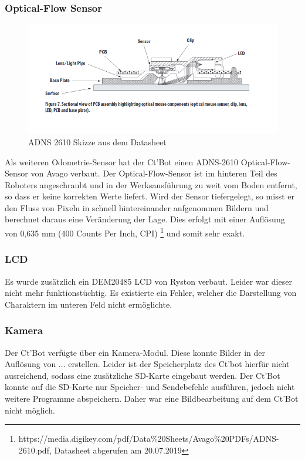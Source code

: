 \documentclass[twoside,11pt, a4paper]{report}
\begin{document}
	\subsubsection{Optical-Flow Sensor}
	\begin{figure}[!htb]
		\centering
		\includegraphics[scale=0.55]{images/adns.png}
		\caption{ADNS 2610 Skizze aus dem Datasheet}
	\end{figure}
	Als weiteren Odometrie-Sensor hat der Ct'Bot einen ADNS-2610 Optical-Flow-Sensor von Avago verbaut. Der Optical-Flow-Sensor ist im hinteren Teil des Roboters angeschraubt und in der Werksausführung zu weit vom Boden entfernt, so dass er keine korrekten Werte liefert. Wird der Sensor tiefergelegt, so misst er den Fluss von Pixeln in schnell hintereinander aufgenommen Bildern und berechnet daraus eine Veränderung der Lage. Dies erfolgt mit einer Auflösung von 0,635 mm (400 Counts Per Inch, CPI) \footnote{https://media.digikey.com/pdf/Data\%20Sheets/Avago\%20PDFs/ADNS-2610.pdf, Datasheet abgerufen am 20.07.2019} und somit sehr exakt. 
	
	\subsubsection{LCD}
	Es wurde zusätzlich ein DEM20485 LCD von Ryston verbaut. Leider war dieser nicht mehr funktionstüchtig. Es existierte ein Fehler, welcher die Darstellung von Charaktern im unteren Feld nicht ermöglichte. 
	
	\subsubsection{Kamera}
	Der Ct'Bot verfügte über ein Kamera-Modul. Diese konnte Bilder in der Auflösung von ... erstellen. Leider ist der Speicherplatz des Ct'bot hierfür nicht ausreichend, sodass eine zusätzliche SD-Karte eingebaut werden. Der Ct'Bot konnte auf die SD-Karte nur Speicher- und Sendebefehle ausführen, jedoch nicht weitere Programme abspeichern. Daher war eine Bildbearbeitung auf dem Ct'Bot nicht möglich.  
	
\end{document}
